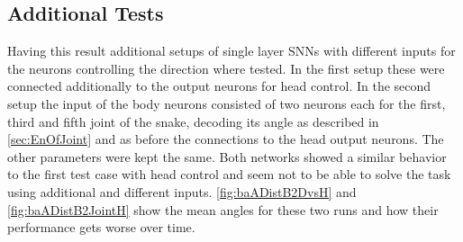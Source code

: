\subsection{Additional Tests}
Having this result additional setups of single layer SNNs with different inputs for the neurons controlling the direction where tested. In the first setup these were connected additionally to the output neurons for head control. In the second setup the input of the body neurons consisted of two neurons each for the first, third and fifth joint of the snake, decoding its angle as described in \autoref{sec:EnOfJoint} and as before the connections to the head output neurons. The other parameters were kept the same.
Both networks showed a similar behavior to the first test case with head control and seem not to be able to solve the task using additional and different inputs. \autoref{fig:baADistB2DvsH} and \autoref{fig:baADistB2JointH} show the mean angles for these two runs and how their performance gets worse over time.

